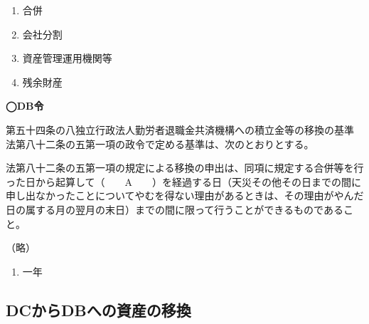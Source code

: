 \begin{answerbox}
  \begin{enumerate}[A: ]
    \item 合併
    \item 会社分割
    \item 資産管理運用機関等
    \item 残余財産
  \end{enumerate}
\end{answerbox}

\begin{fillblank}[年金2 2018 問題1(3)D]
  \noindent \textbf{◯DB令}
  \begin{lawstructure}
    \begin{lawarticle}{第五十四条の八}{独立行政法人勤労者退職金共済機構への積立金等の移換の基準}
      法第八十二条の五第一項の政令で定める基準は、次のとおりとする。

      法第八十二条の五第一項の規定による移換の申出は、同項に規定する合併等を行った日から起算して（　　A　　）を経過する日（天災その他その日までの間に申し出なかったことについてやむを得ない理由があるときは、その理由がやんだ日の属する月の翌月の末日）までの間に限って行うことができるものであること。

      （略）
     \end{lawarticle}
  \end{lawstructure}
\end{fillblank}


\begin{answerbox}
  \begin{enumerate}[A: ]
    \item 一年
  \end{enumerate}
\end{answerbox}

\newpage

\subsection{DCからDBへの資産の移換}

